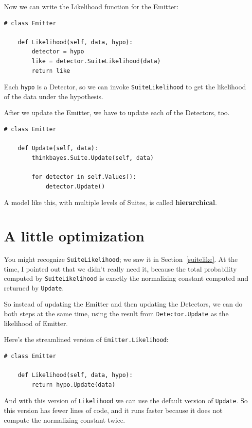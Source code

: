 \documentclass[12pt]{book}
\begin{document}
Now we can write the Likelihood function for the Emitter:

\begin{verbatim}
# class Emitter

    def Likelihood(self, data, hypo):
        detector = hypo
        like = detector.SuiteLikelihood(data)
        return like
\end{verbatim}

Each {\tt hypo} is a Detector, so we can invoke
{\tt SuiteLikelihood} to get the likelihood of the data under
the hypothesis.

After we update the Emitter, we have to update each of the
Detectors, too.  

\begin{verbatim}
# class Emitter

    def Update(self, data):
        thinkbayes.Suite.Update(self, data)
        
        for detector in self.Values():
            detector.Update()
\end{verbatim}

A model like this, with multiple levels of Suites, is called {\bf
  hierarchical}.  


\section{A little optimization}

You might recognize {\tt SuiteLikelihood}; we saw it
in Section~\ref{suitelike}.  At the time, I pointed out that
we didn't really need it, because the total probability
computed by {\tt SuiteLikelihood} is exactly the normalizing
constant computed and returned by {\tt Update}.
 
So instead of updating the Emitter and then updating the
Detectors, we can do both steps at the same time, using
the result from {\tt Detector.Update} as the likelihood
of Emitter.

Here's the streamlined version of {\tt Emitter.Likelihood}:

\begin{verbatim}
# class Emitter

    def Likelihood(self, data, hypo):
        return hypo.Update(data)
\end{verbatim}

And with this version of {\tt Likelihood} we can use the
default version of {\tt Update}.  So this version has fewer
lines of code, and it runs faster because it does not compute
the normalizing constant twice.
\end{document}
